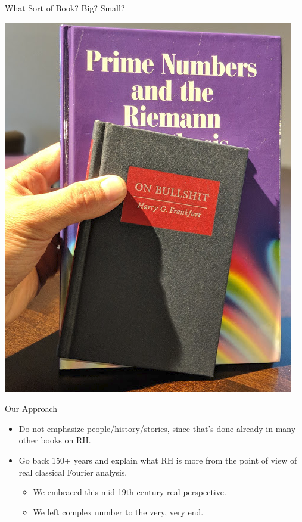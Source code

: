 \documentclass{beamer}
\begin{document}
\begin{frame}{What Sort of Book?  Big? Small?}
\begin{center}
    \includegraphics[height=.75\textheight]{pics/bullshit.png}
  \end{center}
\end{frame}


\begin{frame}{Our Approach}
  \begin{itemize}
    \item Do not emphasize people/history/stories, since that's done already in many other books on RH.
    \item   Go back 150+ years and explain what RH is more from the point of view of real classical Fourier analysis.
          \begin{itemize}
            \item We embraced this mid-19th century real perspective.
            \item We left complex number to the very, very end.
          \end{itemize}
  \end{itemize}
\end{frame}
\end{document}
